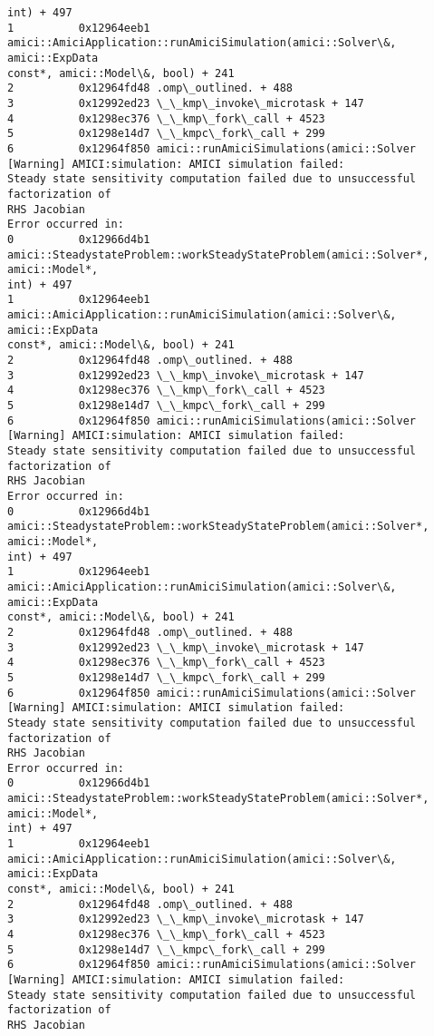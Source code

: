 \documentclass[11pt]{article}
\begin{document}
\begin{Verbatim}[commandchars=\\\{\}]
int) + 497
1          0x12964eeb1
amici::AmiciApplication::runAmiciSimulation(amici::Solver\&, amici::ExpData
const*, amici::Model\&, bool) + 241
2          0x12964fd48 .omp\_outlined. + 488
3          0x12992ed23 \_\_kmp\_invoke\_microtask + 147
4          0x1298ec376 \_\_kmp\_fork\_call + 4523
5          0x1298e14d7 \_\_kmpc\_fork\_call + 299
6          0x12964f850 amici::runAmiciSimulations(amici::Solver
[Warning] AMICI:simulation: AMICI simulation failed:
Steady state sensitivity computation failed due to unsuccessful factorization of
RHS Jacobian
Error occurred in:
0          0x12966d4b1
amici::SteadystateProblem::workSteadyStateProblem(amici::Solver*, amici::Model*,
int) + 497
1          0x12964eeb1
amici::AmiciApplication::runAmiciSimulation(amici::Solver\&, amici::ExpData
const*, amici::Model\&, bool) + 241
2          0x12964fd48 .omp\_outlined. + 488
3          0x12992ed23 \_\_kmp\_invoke\_microtask + 147
4          0x1298ec376 \_\_kmp\_fork\_call + 4523
5          0x1298e14d7 \_\_kmpc\_fork\_call + 299
6          0x12964f850 amici::runAmiciSimulations(amici::Solver
[Warning] AMICI:simulation: AMICI simulation failed:
Steady state sensitivity computation failed due to unsuccessful factorization of
RHS Jacobian
Error occurred in:
0          0x12966d4b1
amici::SteadystateProblem::workSteadyStateProblem(amici::Solver*, amici::Model*,
int) + 497
1          0x12964eeb1
amici::AmiciApplication::runAmiciSimulation(amici::Solver\&, amici::ExpData
const*, amici::Model\&, bool) + 241
2          0x12964fd48 .omp\_outlined. + 488
3          0x12992ed23 \_\_kmp\_invoke\_microtask + 147
4          0x1298ec376 \_\_kmp\_fork\_call + 4523
5          0x1298e14d7 \_\_kmpc\_fork\_call + 299
6          0x12964f850 amici::runAmiciSimulations(amici::Solver
[Warning] AMICI:simulation: AMICI simulation failed:
Steady state sensitivity computation failed due to unsuccessful factorization of
RHS Jacobian
Error occurred in:
0          0x12966d4b1
amici::SteadystateProblem::workSteadyStateProblem(amici::Solver*, amici::Model*,
int) + 497
1          0x12964eeb1
amici::AmiciApplication::runAmiciSimulation(amici::Solver\&, amici::ExpData
const*, amici::Model\&, bool) + 241
2          0x12964fd48 .omp\_outlined. + 488
3          0x12992ed23 \_\_kmp\_invoke\_microtask + 147
4          0x1298ec376 \_\_kmp\_fork\_call + 4523
5          0x1298e14d7 \_\_kmpc\_fork\_call + 299
6          0x12964f850 amici::runAmiciSimulations(amici::Solver
[Warning] AMICI:simulation: AMICI simulation failed:
Steady state sensitivity computation failed due to unsuccessful factorization of
RHS Jacobian

\end{Verbatim}
\end{document}
